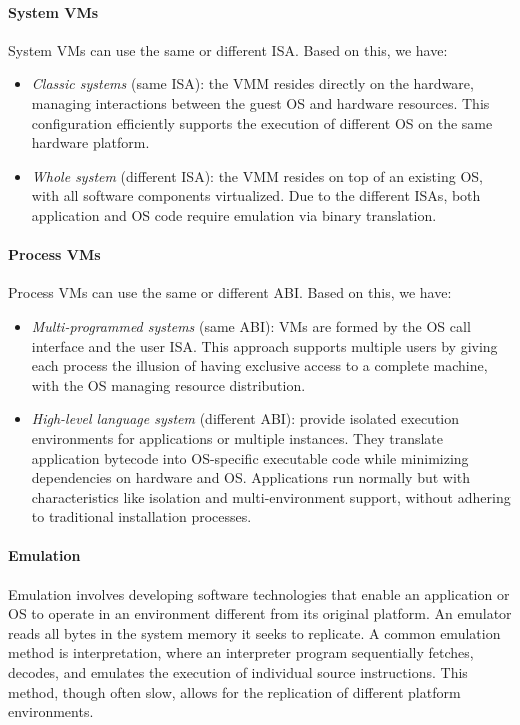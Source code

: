 \paragraph*{System VMs}
System VMs can use the same or different ISA. 
Based on this, we have:
\begin{itemize}
    \item \textit{Classic systems} (same ISA): the VMM resides directly on the hardware, managing interactions between the guest OS and hardware resources.
        This configuration efficiently supports the execution of different OS on the same hardware platform.
    \item \textit{Whole system} (different ISA): the VMM resides on top of an existing OS, with all software components virtualized.
        Due to the different ISAs, both application and OS code require emulation via binary translation.
\end{itemize}

\paragraph*{Process VMs}
Process VMs can use the same or different ABI. 
Based on this, we have:
\begin{itemize}
    \item \textit{Multi-programmed systems} (same ABI): VMs are formed by the OS call interface and the user ISA.
        This approach supports multiple users by giving each process the illusion of having exclusive access to a complete machine, with the OS managing resource distribution.
    \item \textit{High-level language system} (different ABI): provide isolated execution environments for applications or multiple instances.
        They translate application bytecode into OS-specific executable code while minimizing dependencies on hardware and OS.
        Applications run normally but with characteristics like isolation and multi-environment support, without adhering to traditional installation processes.
\end{itemize}

\paragraph*{Emulation}
Emulation involves developing software technologies that enable an application or OS to operate in an environment different from its original platform.
An emulator reads all bytes in the system memory it seeks to replicate.
A common emulation method is interpretation, where an interpreter program sequentially fetches, decodes, and emulates the execution of individual source instructions. 
This method, though often slow, allows for the replication of different platform environments.

